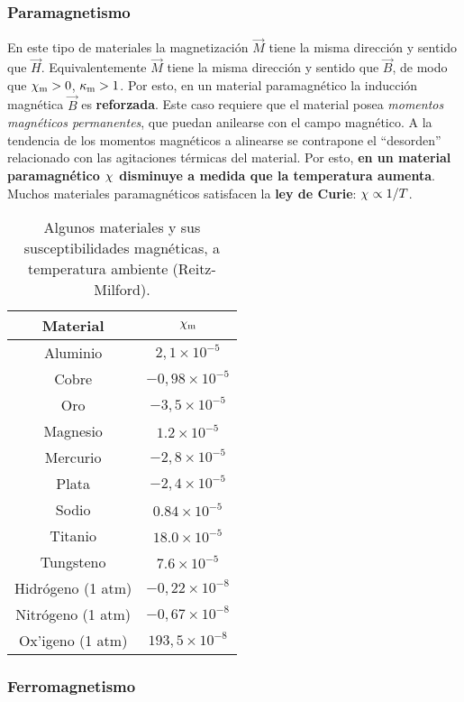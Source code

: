 \subsubsection{Paramagnetismo}
 En este tipo de materiales la magnetización $\vec{M}$
tiene la misma dirección y sentido que $\vec{H}$. Equivalentemente $\vec{M}$
tiene la misma dirección y sentido que $\vec{B}$, de modo que
$\chi_{\rm m}>0$, $\kappa_{\rm m}>1$. Por esto, en un material paramagnético la inducción magnética $\vec{B}$ es \textbf{reforzada}. Este caso requiere que el material posea \textit{momentos magnéticos permanentes}, que puedan anilearse con el campo magnético.
A la tendencia de los momentos magnéticos a alinearse se
contrapone el ``desorden'' relacionado con las agitaciones térmicas del
material. Por esto, \textbf{en un material paramagnético $\chi_{\rm}$ disminuye a
medida que la temperatura aumenta}. Muchos materiales paramagnéticos satisfacen
la \textbf{ley de Curie}: $\chi_{\rm}\propto 1/T$.
\begin{table}[h!]
\begin{center}
\begin{tabular}{c|c}
Material & $\chi_{\rm m}$ \\ \hline\hline
Aluminio & $2,1\times 10^{-5}$ \\
Cobre & $-0,98\times 10^{-5}$ \\
Oro & $-3,5\times 10^{-5}$ \\
Magnesio & $1.2\times 10^{-5}$ \\
Mercurio & $-2,8\times 10^{-5}$ \\
Plata & $-2,4\times 10^{-5}$ \\
Sodio & $0.84\times 10^{-5}$ \\
Titanio & $18.0\times 10^{-5}$ \\
Tungsteno & $7.6\times 10^{-5}$ \\
Hidrógeno (1 atm) & $-0,22\times 10^{-8}$ \\
Nitrógeno (1 atm) & $-0,67\times 10^{-8}$ \\
Ox'igeno (1 atm) & $193,5\times 10^{-8}$
\end{tabular}
\caption{Algunos materiales y sus susceptibilidades magnéticas, a temperatura ambiente (Reitz-Milford).}
\end{center}
\end{table}

\subsubsection{Ferromagnetismo}

